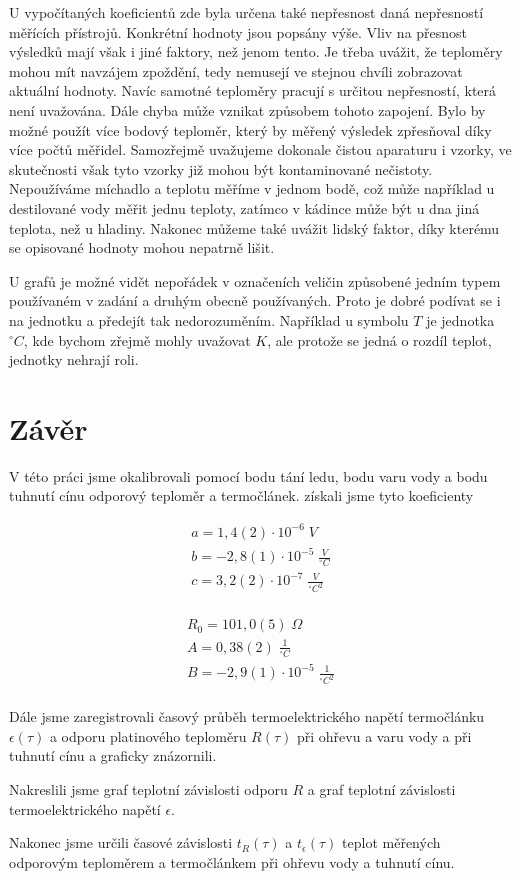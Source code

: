 U vypočítaných koeficientů zde byla určena také nepřesnost daná nepřesností měřících přístrojů. Konkrétní hodnoty jsou popsány výše. Vliv na přesnost výsledků mají však i jiné faktory, než jenom tento. Je třeba uvážit, že teploměry mohou mít navzájem zpoždění, tedy nemusejí ve stejnou chvíli zobrazovat aktuální hodnoty. Navíc samotné teploměry pracují s určitou nepřesností, která není uvažována. Dále chyba může vznikat způsobem tohoto zapojení. Bylo by možné použít více bodový teploměr, který by měřený výsledek zpřesňoval díky více počtů měřidel. Samozřejmě uvažujeme dokonale čistou aparaturu i vzorky, ve skutečnosti však tyto vzorky již mohou být kontaminované nečistoty. Nepoužíváme míchadlo a teplotu měříme v jednom bodě, což může například u destilované vody měřit jednu teploty, zatímco v kádince může být u dna jiná teplota, než u hladiny. Nakonec můžeme také uvážit lidský faktor, díky kterému se opisované hodnoty mohou nepatrně lišit.

U grafů je možné vidět nepořádek v označeních veličin způsobené jedním typem používaném v zadání a druhým obecně používaných. Proto je dobré podívat se i na jednotku a předejít tak nedorozuměním. Například u symbolu $T$ je jednotka $^\circ C$, kde bychom zřejmě mohly uvažovat $K$, ale protože se jedná o rozdíl teplot, jednotky nehrají roli.

\newpage
\section{Závěr}

V této práci jsme okalibrovali pomocí bodu tání ledu, bodu varu vody a bodu tuhnutí cínu odporový teploměr a termočlánek. získali jsme tyto koeficienty

\begin{align*}
    a = 1,4(2) \cdot 10^{-6} \; V\\
    b = -2,8(1) \cdot 10^{-5} \; \frac{V}{^\circ C}\\
    c = 3,2(2) \cdot 10^{-7} \; \frac{V}{^\circ C^2} \\
\end{align*}

\begin{align*}
    R_0 = 101,0(5) \; \Omega \\
    A = 0,38(2) \; \frac{1}{^\circ C} \\
    B = -2,9(1) \cdot 10^{-5} \; \frac{1}{^\circ C^2} \\
\end{align*}

Dále jsme zaregistrovali časový průběh termoelektrického napětí termočlánku $\epsilon (\tau)$ a odporu platinového teploměru $R(\tau)$ při ohřevu a varu vody a při tuhnutí cínu a graficky znázornili.

Nakreslili jsme graf teplotní závislosti odporu $R$ a graf teplotní závislosti termoelektrického napětí $\epsilon$.

 Nakonec jsme určili časové závislosti $t_R(\tau)$ a $t_\epsilon(\tau)$ teplot měřených odporovým teploměrem a termočlánkem při ohřevu vody a tuhnutí cínu.